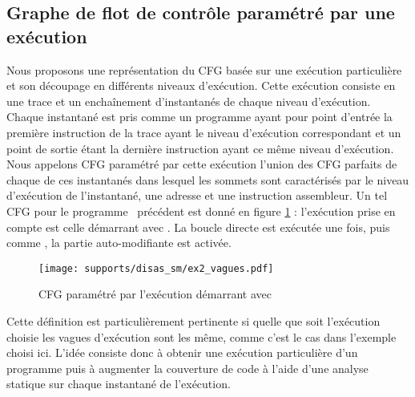 \subsection{Graphe de flot de contrôle paramétré par une exécution}
Nous proposons une représentation du CFG basée sur une exécution particulière et son découpage en différents niveaux d'exécution.
Cette exécution consiste en une trace et un enchaînement d'instantanés de chaque niveau d'exécution.
Chaque instantané est pris comme un programme ayant pour point d'entrée la première instruction de la trace ayant le niveau d'exécution correspondant et un point de sortie étant la dernière instruction ayant ce même niveau d'exécution.
Nous appelons CFG paramétré par cette exécution l'union des CFG parfaits de chaque de ces instantanés dans lesquel les sommets sont caractérisés par le niveau d'exécution de l'instantané, une adresse et une instruction assembleur.
Un tel CFG pour le programme \sm\ précédent est donné en figure \ref{fig:sm_cfg_vagues} : l'exécution prise en compte est celle démarrant avec . La boucle directe est exécutée une fois, puis comme , la partie auto-modifiante est activée.


\begin{figure}[h]
\begin{center}
  \texttt{[image: supports/disas\_sm/ex2\_vagues.pdf]}
\end{center}
\caption{CFG paramétré par l'exécution démarrant avec }
\label{fig:sm_cfg_vagues}
\end{figure}

Cette définition est particulièrement pertinente si quelle que soit l'exécution choisie les vagues d'exécution sont les même, comme c'est le cas dans l'exemple choisi ici.
L'idée consiste donc à obtenir une exécution particulière d'un programme puis à augmenter la couverture de code à l'aide d'une analyse statique sur chaque instantané de l'exécution.

